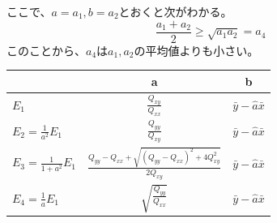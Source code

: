 ここで、$a=a_1,b=a_2$とおくと次がわかる。
\begin{equation*}
 \frac{a_1+a_2}{2}  \geq  \sqrt{a_1 a_2} = a_4
\end{equation*}
このことから、$a_4$は$a_1,a_2$の平均値よりも小さい。



\begin{table}[http]
 \centering
 \begin{tabular}{lcc}
  & a & b\\
  \hline 
  $E_1$ & $\frac{Q_{xy}}{Q_{xx}}$  &$\bar{y}-\hat{a}\bar{x}$ \\
  $E_2=\frac{1}{a^2}E_1$ & $\frac{Q_{yy}}{Q_{xy}}$ & $\bar{y}-\hat{a}\bar{x}$ \\
$E_3=\frac{1}{1+a^2}E_1$ & $\frac{Q_{yy}-Q_{xx}+\sqrt{(Q_{yy}-Q_{xx})^2+4Q_{xy}^2}}{2Q_{xy}}$ & $\bar{y}-\hat{a}\bar{x}$ \\
  $E_4=\frac{1}{a}E_1$ & $\sqrt{\frac{Q_{yy}}{Q_{xx}}}$ & $\bar{y}-\hat{a}\bar{x}$
 \end{tabular}
\end{table}


